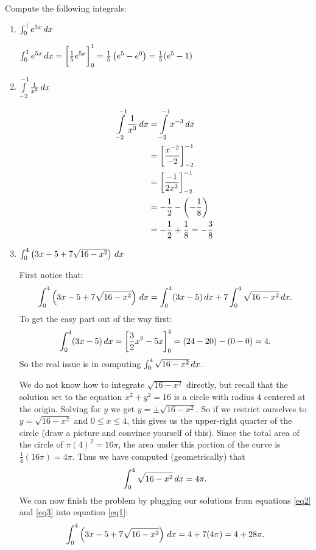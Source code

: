 \documentclass[nooutcomes]{ximera}
\begin{document}
\begin{problem}
Compute the following integrals:
	\begin{enumerate}
	
	\item  $\int_0^1 e^{5x} \,d x$
		\begin{freeResponse}
		$\int_0^1 e^{5x} \,d x  = \bigg[ \frac{1}{5} e^{5x} \bigg]_0^1= \frac{1}{5} \left( e^5 - e^0 \right) = \frac{1}{5} (e^5 - 1)$
		\end{freeResponse}
		
		
		
	\item  $\int\limits_{-2}^{-1} \frac{1}{x^3} \,d x$
		\begin{freeResponse}
			\begin{align*}
			\int\limits_{-2}^{-1} \frac{1}{x^3} \,d x &= \int\limits_{-2}^{-1} x^{-3} \,d x  \\
			&= \bigg[ \frac{x^{-2}}{-2} \bigg]_{-2}^{-1}  \\
			&= \bigg[ \frac{-1}{2x^2} \bigg]_{-2}^{-1}  \\
			&= - \frac{1}{2} - \left( - \frac{1}{8} \right)  \\
			&= - \frac{1}{2} + \frac{1}{8} = - \frac{3}{8}
			\end{align*}
		\end{freeResponse}
		
		
		
	\item  $\int _0^4 \left( 3x - 5 + 7 \sqrt{16-x^2} \right) \,d x$
		\begin{freeResponse}
		First notice that:
		\begin{equation}\label{eq1}
		\int _0^4 \left( 3x - 5 + 7 \sqrt{16-x^2} \right) \,d x = \int_0^4 ( 3x - 5) \,d x + 7 \int_0^4 \sqrt{16-x^2} \,d x.
		\end{equation}
		To get the easy part out of the way first:
		\begin{equation}\label{eq2}
		\int_0^4 (3x-5) \,d x = \bigg[ \frac{3}{2} x^2 - 5x \bigg]_0^4 = (24 - 20) - (0-0) = 4. 
		\end{equation}
		So the real issue is in computing $\int_0^4 \sqrt{16-x^2} \,d x$.  
		
		We do not know how to integrate $\sqrt{16-x^2}$ directly, but recall that the solution set to the equation $x^2 + y^2 = 16$ is a circle with radius $4$ centered at the origin.  
		Solving for $y$ we get $y = \pm \sqrt{16-x^2}$.  
		So if we restrict ourselves to $y=\sqrt{16-x^2}$ and $0 \leq x \leq 4$, this gives us the upper-right quarter of the circle (draw a picture and convince yourself of this).  
		Since the total area of the circle of $\pi (4)^2 = 16\pi$, the area under this portion of the curve is $\frac{1}{4} (16\pi) = 4\pi$.  
		Thus we have computed (geometrically) that 
		\begin{equation}\label{eq3}
		\int_0^4 \sqrt{16-x^2} \,d x = 4\pi. 
		\end{equation}
		We can now finish the problem by plugging our solutions from equations \eqref{eq2} and \eqref{eq3} into equation \eqref{eq1}:
		$$\int _0^4 \left( 3x - 5 + 7 \sqrt{16-x^2} \right) \,d x = 4 + 7(4\pi) = 4 + 28\pi. $$
		\end{freeResponse}
		

\end{enumerate}
\end{problem}
\end{document}

